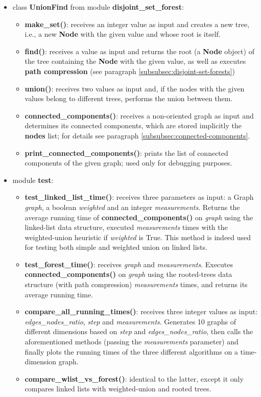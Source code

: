 \documentclass[11pt]{article}
\begin{document}
\begin{itemize}
        \item class \textbf{UnionFind} from module \textbf{disjoint\_set\_forest}:
        \begin{itemize}
            \item \textbf{make\_set()}:  receives an integer value as input and creates a new tree, i.e., a new \textbf{Node} with the given value and whose root is itself.
            \item \textbf{find()}: receives a value as input and returns the root (a \textbf{Node} object) of the tree containing the \textbf{Node} with the given value, as well as executes \textbf{path compression} (see paragraph \ref{subsubsec:disjoint-set-forests})
            \item \textbf{union()}: receives two values as input and, if the nodes with the given values belong to different trees, performs the union between them.
            \item \textbf{connected\_components()}: receives a non-oriented graph as input and determines its connected components, which are stored implicitly the \textbf{nodes} list; for details see paragraph \ref{subsubsec:connected-components}.
            \item \textbf{print\_connected\_components()}: prints the list of connected components of the given graph; used only for debugging purposes.
        \end{itemize}
        \item module \textbf{test}:
        \begin{itemize}
            \item \textbf{test\_linked\_list\_time()}: receives three parameters as input: a Graph \textit{graph}, a boolean \textit{weighted} and an integer \textit{measurements}. Returns the average running time of \textbf{connected\_components()} on \textit{graph} using the linked-list data structure, executed \textit{measurements} times with the weighted-union heuristic if \textit{weighted} is True. This method is indeed used for testing both  simple and weighted union on linked lists.
            \item \textbf{test\_forest\_time()}: receives \textit{graph} and \textit{measurements}. Executes \textbf{connected\_components()} on \textit{graph} using the rooted-trees data structure (with path compression) \textit{measurements} times, and returns its average running time.
            \item \textbf{compare\_all\_running\_times()}: receives three integer values as input: \textit{edges\_nodes\_ratio}, \textit{step} and \textit{measurements}. Generates 10 graphs of different dimensions based on \textit{step} and \textit{edges\_nodes\_ratio}, then calls the aforementioned methods (passing the \textit{measurements} parameter) and finally plots the running times of the three different algorithms on a time-dimension graph.
            \item \textbf{compare\_wlist\_vs\_forest()}: identical to the latter, except it only compares linked lists with weighted-union and rooted trees.
        \end{itemize}
        
    \end{itemize}
\end{document}
